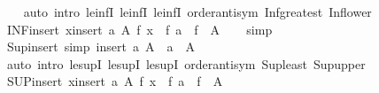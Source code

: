 \begin{isabellebody}
\ \ %
\endisadelimproof
%
\isatagproof
{}\isamarkupfalse%
\ {\isacharparenleft}{\kern0pt}auto\ intro{\isacharcolon}{\kern0pt}\ le{\isacharunderscore}{\kern0pt}infI\ le{\isacharunderscore}{\kern0pt}infI{}\ le{\isacharunderscore}{\kern0pt}infI{}\ order{\isachardot}{\kern0pt}antisym\ Inf{\isacharunderscore}{\kern0pt}greatest\ Inf{\isacharunderscore}{\kern0pt}lower{\isacharparenright}{\kern0pt}%
\endisatagproof
{\isafoldproof}%
%
\isadelimproof
\isanewline
%
\endisadelimproof
\isanewline
{}\isamarkupfalse%
\ INF{\isacharunderscore}{\kern0pt}insert{\isacharcolon}{\kern0pt}\ {\isachardoublequoteopen}{\isacharparenleft}{\kern0pt}{\isasymSqinter}x{\isasymin}insert\ a\ A{\isachardot}{\kern0pt}\ f\ x{\isacharparenright}{\kern0pt}\ {\isacharequal}{\kern0pt}\ f\ a\ {\isasymsqinter}\ {\isasymSqinter}{\isacharparenleft}{\kern0pt}f\ {\isacharbackquote}{\kern0pt}\ A{\isacharparenright}{\kern0pt}{\isachardoublequoteclose}\isanewline
%
\isadelimproof
\ \ %
\endisadelimproof
%
\isatagproof
{}\isamarkupfalse%
\ simp%
\endisatagproof
{\isafoldproof}%
%
\isadelimproof
\isanewline
%
\endisadelimproof
\isanewline
{}\isamarkupfalse%
\ Sup{\isacharunderscore}{\kern0pt}insert\ {\isacharbrackleft}{\kern0pt}simp{\isacharbrackright}{\kern0pt}{\isacharcolon}{\kern0pt}\ {\isachardoublequoteopen}{\isasymSqunion}{\isacharparenleft}{\kern0pt}insert\ a\ A{\isacharparenright}{\kern0pt}\ {\isacharequal}{\kern0pt}\ a\ {\isasymsqunion}\ {\isasymSqunion}A{\isachardoublequoteclose}\isanewline
%
\isadelimproof
\ \ %
\endisadelimproof
%
\isatagproof
{}\isamarkupfalse%
\ {\isacharparenleft}{\kern0pt}auto\ intro{\isacharcolon}{\kern0pt}\ le{\isacharunderscore}{\kern0pt}supI\ le{\isacharunderscore}{\kern0pt}supI{}\ le{\isacharunderscore}{\kern0pt}supI{}\ order{\isachardot}{\kern0pt}antisym\ Sup{\isacharunderscore}{\kern0pt}least\ Sup{\isacharunderscore}{\kern0pt}upper{\isacharparenright}{\kern0pt}%
\endisatagproof
{\isafoldproof}%
%
\isadelimproof
\isanewline
%
\endisadelimproof
\isanewline
{}\isamarkupfalse%
\ SUP{\isacharunderscore}{\kern0pt}insert{\isacharcolon}{\kern0pt}\ {\isachardoublequoteopen}{\isacharparenleft}{\kern0pt}{\isasymSqunion}x{\isasymin}insert\ a\ A{\isachardot}{\kern0pt}\ f\ x{\isacharparenright}{\kern0pt}\ {\isacharequal}{\kern0pt}\ f\ a\ {\isasymsqunion}\ {\isasymSqunion}{\isacharparenleft}{\kern0pt}f\ {\isacharbackquote}{\kern0pt}\ A{\isacharparenright}{\kern0pt}{\isachardoublequoteclose}\isanewline
%
\isadelimproof
\ \ %
\endisadelimproof
%
\isatagproof

\end{isabellebody}
